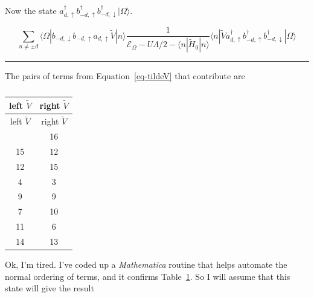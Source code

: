 \documentclass[
  letterpaper,
  DIV=11,
  numbers=noendperiod]{scrartcl}
\begin{document}
Now the state
\(a^\dagger_{d,\uparrow}b^\dagger_{-d,\uparrow}b^\dagger_{-d,\downarrow}|\Omega\rangle\).

\begin{equation}
\sum_{n\ne \pm d}\langle\Omega|b_{-d,\downarrow}b_{-d,\uparrow}a_{d,\uparrow}\tilde V|n\rangle\frac{1}{\mathcal{E}_\Omega-U\Lambda/2-\langle n|\tilde H_0|n\rangle}\langle n|\tilde V a^\dagger_{d,\uparrow}b^\dagger_{-d,\uparrow}b^\dagger_{-d,\downarrow}|\Omega\rangle
\end{equation}

\begin{center}\rule{0.5\linewidth}{0.5pt}\end{center}

The pairs of terms from Equation~\ref{eq-tildeV} that contribute are

\begin{longtable}[]{@{}cc@{}}
\caption{}\label{tbl-here}\tabularnewline
\toprule\noalign{}
left \(\tilde V\) & right \(\tilde V\) \\
\midrule\noalign{}
\endfirsthead
\toprule\noalign{}
left \(\tilde V\) & right \(\tilde V\) \\
\midrule\noalign{}
\endhead
\bottomrule\noalign{}
\endlastfoot
16 & 16 \\
15 & 12 \\
12 & 15 \\
4 & 3 \\
9 & 9 \\
7 & 10 \\
11 & 6 \\
14 & 13 \\
\end{longtable}

Ok, I'm tired. I've coded up a \emph{Mathematica} routine that helps
automate the normal ordering of terms, and it confirms
Table~\ref{tbl-here}. So I will assume that this state will give the
result
\end{document}
